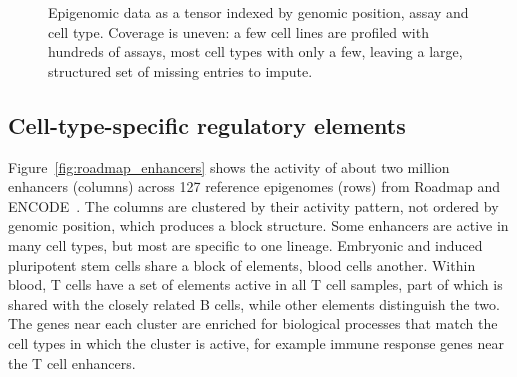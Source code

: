 \begin{figure}[t]
  \centering
  \caption{Epigenomic data as a tensor indexed by genomic position, assay and cell type. Coverage is uneven: a few cell lines are profiled with hundreds of assays, most cell types with only a few, leaving a large, structured set of missing entries to impute.}
  \label{fig:tensor}
\end{figure}

\subsection{Cell-type-specific regulatory elements}

Figure~\ref{fig:roadmap_enhancers} shows the activity of about two million enhancers (columns) across 127 reference epigenomes (rows) from Roadmap and ENCODE~\citep{roadmap2015}. The columns are clustered by their activity pattern, not ordered by genomic position, which produces a block structure. Some enhancers are active in many cell types, but most are specific to one lineage. Embryonic and induced pluripotent stem cells share a block of elements, blood cells another. Within blood, T cells have a set of elements active in all T cell samples, part of which is shared with the closely related B cells, while other elements distinguish the two. The genes near each cluster are enriched for biological processes that match the cell types in which the cluster is active, for example immune response genes near the T cell enhancers.

